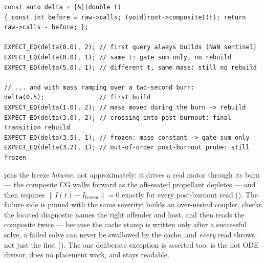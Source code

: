 \begin{listing}[htbp]
\begin{verbatim}
const auto delta = [&](double t)
{ const int before = raw->calls; (void)root->compositeI(t); return raw->calls - before; };

EXPECT_EQ(delta(0.0), 2); // first query always builds (NaN sentinel)
EXPECT_EQ(delta(0.0), 1); // same t: gate sum only, no rebuild
EXPECT_EQ(delta(5.0), 1); // different t, same mass: still no rebuild

// ... and with mass ramping over a two-second burn:
delta(0.5);               // first build
EXPECT_EQ(delta(1.0), 2); // mass moved during the burn -> rebuild
EXPECT_EQ(delta(3.0), 2); // crossing into post-burnout: final transition rebuild
EXPECT_EQ(delta(3.5), 1); // frozen: mass constant -> gate sum only
EXPECT_EQ(delta(3.2), 1); // out-of-order post-burnout probe: still frozen
\end{verbatim}
\caption{Cache rebuilds as arithmetic: the call-count delta distinguishes a rebuild ($2$) from a
gate-only hit ($1$), so the gate's whole lifecycle --- first build, constant-mass hits, burn
tracking, the burnout transition, and the out-of-order probe an adaptive integrator can issue ---
is pinned in a dozen lines. From  and
.}\label{lst:verification-counting}
\end{listing}

\begin{sloppypar}
 pins the freeze \emph{bitwise}, not
approximately: it drives a real motor through its burn ---
the composite CG walks forward as the aft-seated propellant depletes --- and then requires
$\lVert I(t) - I_{\mathrm{frozen}}\rVert = 0$ exactly for every post-burnout read
(). The failure side is pinned with the same
severity:  builds an over-nested coupler,
checks the located diagnostic names the right offender and host, and then reads the composite
twice --- because the cache stamp is written only after a successful solve, a failed solve can
never be swallowed by the cache, and \emph{every} read throws, not just the first
(). The one deliberate exception is asserted too:
 is the hot ODE divisor, does no placement work, and stays readable.
\end{sloppypar}

